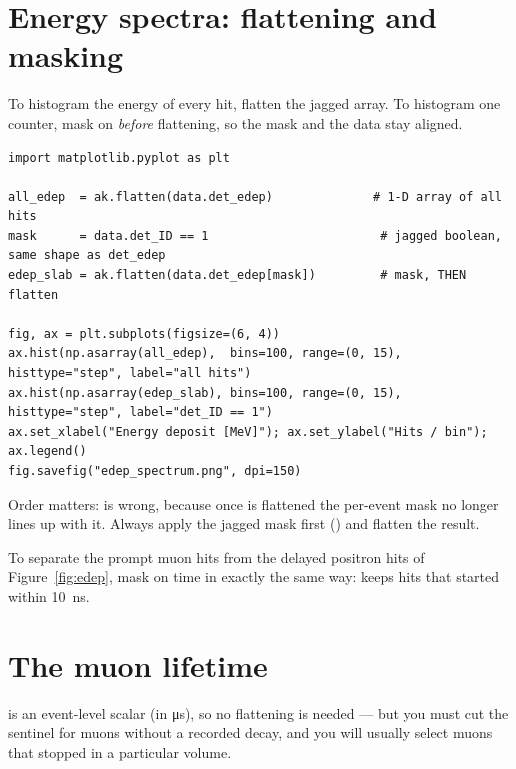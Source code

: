 \section{Energy spectra: flattening and masking}
To histogram the energy of every hit, flatten the jagged array. To histogram one counter, mask on  \emph{before} flattening, so the mask and the data stay aligned.

\begin{lstlisting}[style=py,caption={All-hit spectrum, and a single-counter spectrum}]
import matplotlib.pyplot as plt

all_edep  = ak.flatten(data.det_edep)              # 1-D array of all hits
mask      = data.det_ID == 1                        # jagged boolean, same shape as det_edep
edep_slab = ak.flatten(data.det_edep[mask])         # mask, THEN flatten

fig, ax = plt.subplots(figsize=(6, 4))
ax.hist(np.asarray(all_edep),  bins=100, range=(0, 15), histtype="step", label="all hits")
ax.hist(np.asarray(edep_slab), bins=100, range=(0, 15), histtype="step", label="det_ID == 1")
ax.set_xlabel("Energy deposit [MeV]"); ax.set_ylabel("Hits / bin"); ax.legend()
fig.savefig("edep_spectrum.png", dpi=150)
\end{lstlisting}

\begin{pitfall}
Order matters:  is wrong, because once  is flattened the per-event mask no longer lines up with it. Always apply the jagged mask first () and flatten the result.
\end{pitfall}

To separate the prompt muon hits from the delayed positron hits of Figure~\ref{fig:edep}, mask on time in exactly the same way:  keeps hits that started within \SI{10}{ns}.

\section{The muon lifetime}
 is an event-level scalar (in \si{\micro s}), so no flattening is needed --- but you must cut the sentinel for muons without a recorded decay, and you will usually select muons that stopped in a particular volume.

